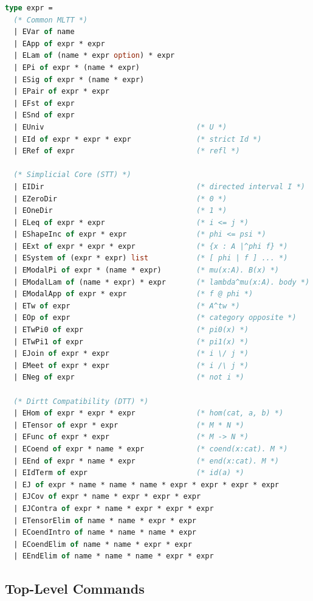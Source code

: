 \documentclass[11pt]{article}
\begin{document}
\begin{lstlisting}[language=ml]
type expr =
  (* Common MLTT *)
  | EVar of name
  | EApp of expr * expr
  | ELam of (name * expr option) * expr
  | EPi of expr * (name * expr)
  | ESig of expr * (name * expr)
  | EPair of expr * expr
  | EFst of expr
  | ESnd of expr
  | EUniv                                   (* U *)
  | EId of expr * expr * expr               (* strict Id *)
  | ERef of expr                            (* refl *)

  (* Simplicial Core (STT) *)
  | EIDir                                   (* directed interval I *)
  | EZeroDir                                (* 0 *)
  | EOneDir                                 (* 1 *)
  | ELeq of expr * expr                     (* i <= j *)
  | EShapeInc of expr * expr                (* phi <= psi *)
  | EExt of expr * expr * expr              (* {x : A |^phi f} *)
  | ESystem of (expr * expr) list           (* [ phi | f ] ... *)
  | EModalPi of expr * (name * expr)        (* mu(x:A). B(x) *)
  | EModalLam of (name * expr) * expr       (* lambda^mu(x:A). body *)
  | EModalApp of expr * expr                (* f @ phi *)
  | ETw of expr                             (* A^tw *)
  | EOp of expr                             (* category opposite *)
  | ETwPi0 of expr                          (* pi0(x) *)
  | ETwPi1 of expr                          (* pi1(x) *)
  | EJoin of expr * expr                    (* i \/ j *)
  | EMeet of expr * expr                    (* i /\ j *)
  | ENeg of expr                            (* not i *)

  (* Dirtt Compatibility (DTT) *)
  | EHom of expr * expr * expr              (* hom(cat, a, b) *)
  | ETensor of expr * expr                  (* M * N *)
  | EFunc of expr * expr                    (* M -> N *)
  | ECoend of expr * name * expr            (* coend(x:cat). M *)
  | EEnd of expr * name * expr              (* end(x:cat). M *)
  | EIdTerm of expr                         (* id(a) *)
  | EJ of expr * name * name * name * expr * expr * expr * expr
  | EJCov of expr * name * expr * expr * expr
  | EJContra of expr * name * expr * expr * expr
  | ETensorElim of name * name * expr * expr
  | ECoendIntro of name * name * name * expr
  | ECoendElim of name * name * expr * expr
  | EEndElim of name * name * name * expr * expr
\end{lstlisting}

\subsection{Top-Level Commands}
\end{document}
